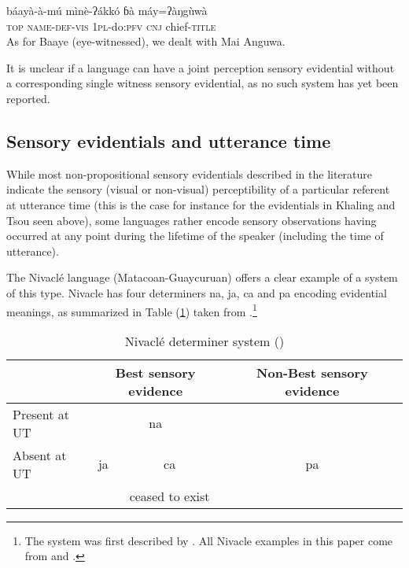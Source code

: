 \documentclass[oneside,a4paper,11pt]{article}
\newcommand{\ipa}[1]{{\phon \mbox{#1}}} %
\begin{document}
 \begin{exe}
\ex \label{ex:baayaamu}
\gll \ipa{tò} 	\ipa{báayà-à-mú} 	\ipa{mìnè-ʔákkó} 	\ipa{ɓà} 	\ipa{máy=ʔàŋgùwà}  \\
\textsc{top} \textsc{name-def-vis} \textsc{1pl}-do:\textsc{pfv} \textsc{cnj} chief-\textsc{title} \\
\glt As for Baaye (eye-witnessed), we dealt with Mai Anguwa.
\end{exe}

It is unclear if a language can have a joint perception sensory evidential without a corresponding single witness sensory evidential, as no such system has yet been reported.

\subsection{Sensory evidentials and utterance time} \label{sec:UT}
While most non-propositional sensory evidentials described in the literature indicate the sensory (visual or non-visual) perceptibility of a particular referent at utterance time (this is the case for instance for the evidentials in Khaling  and Tsou seen above), some languages rather encode sensory observations having occurred at any point during the lifetime of the speaker (including the time of utterance).

  The Nivaclé language (Matacoan-Guaycuruan) offers a clear example of a system of this type. Nivacle has four determiners \ipa{na}, \ipa{ja}, \ipa{ca}  and \ipa{pa} encoding evidential meanings, as summarized in Table (\ref{tab:nivakle}) taken from \citet{gutierrez14determiners}.\footnote{The system was first described by \citet[363]{stell89niwakle}. All Nivacle examples in this paper come from \citet{gutierrez11evidentiality} and \citet{gutierrez14determiners}.}  
  
  
\begin{table}[H]
\caption{Nivaclé determiner system (\citealt{gutierrez14determiners}) } \centering \label{tab:nivakle}
\begin{tabular}{l|c|cc|cc}
\toprule
&\multicolumn{2}{c}{Best sensory evidence} &&Non-Best sensory evidence \\
\hline
Present at UT & \multicolumn{2}{c}{\ipa{na}}&& \\
\cline{1-4}
Absent at UT &\ipa{ja} & \ipa{ca}&&\ipa{pa}& \\
&&ceased to exist&\\
\bottomrule
\end{tabular}
\end{table}
   
\end{document}

